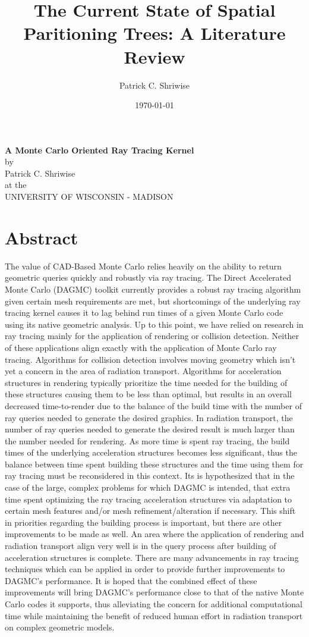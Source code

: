 \documentclass[10pt, a4paper]{article}
\title{\textbf{The Current State of Spatial Paritioning Trees: A Literature Review}}
\author{Patrick C. Shriwise}
\date{\today}
\begin{document}
\begin{center}
  \textbf{A Monte Carlo Oriented Ray Tracing Kernel} \\
  \bigskip
  by \\
  \bigskip
  Patrick C. Shriwise \\
  \bigskip 
  at the \\
  \bigskip
  UNIVERSITY OF WISCONSIN - MADISON \\
\end{center}

\newpage
\tableofcontents 

\section{Abstract}

The value of CAD-Based Monte Carlo relies heavily on the ability to return geometric queries quickly and robustly via ray tracing. The Direct Accelerated Monte Carlo (DAGMC) toolkit currently provides a robust ray tracing algorithm\cite{thesis_smith_2010} given certain mesh requirements are met, but shortcomings of the underlying ray tracing kernel causes it to lag behind run times of a given Monte Carlo code using its native geometric analysis. Up to this point, we have relied on research in ray tracing mainly for the application of rendering or collision detection. Neither of these applications align exactly with the application of Monte Carlo ray tracing. Algorithms for collision detection involves moving geometry which isn’t yet a concern in the area of radiation transport. Algorithms for acceleration structures in rendering typically prioritize the time needed for the building of these structures causing them to be less than optimal, but results in an overall decreased time-to-render due to the balance of the build time with the number of ray queries needed to generate the desired graphics. In radiation transport, the number of ray queries needed to generate the desired result is much larger than the number needed for rendering. As more time is spent ray tracing, the build times of the underlying acceleration structures becomes less significant, thus the balance between time spent building these structures and the time using them for ray tracing must be reconsidered in this context. Its is hypothesized that in the case of the large, complex problems for which DAGMC is intended, that extra time spent optimizing the ray tracing acceleration structures via adaptation to certain mesh features and/or mesh refinement/alteration if necessary. This shift in priorities regarding the building process is important, but there are other improvements to be made as well. An area where the application of rendering and radiation transport align very well is in the query process after building of acceleration structures is complete. There are many advancements in ray tracing techniques which can be applied in order to provide further improvements to DAGMC’s performance. It is hoped that the combined effect of these improvements will bring DAGMC’s performance close to that of the native Monte Carlo codes it supports, thus alleviating the concern for additional computational time while maintaining the benefit of reduced human effort in radiation transport on complex geometric models.
\end{document}
